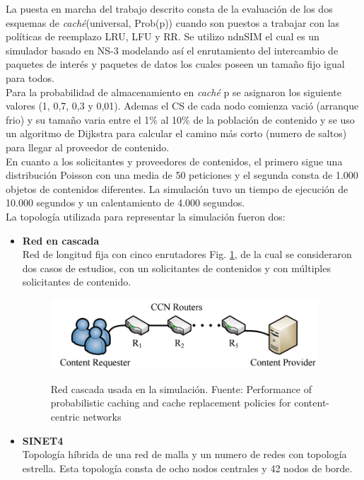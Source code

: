 \documentclass[12pt]{ociamthesis}  %
\begin{document}
La puesta en marcha del trabajo descrito consta de la evaluación de los dos esquemas de \textit{caché}(universal, Prob(p)) cuando son puestos a trabajar con las políticas de reemplazo LRU, LFU y RR. Se utilizo ndnSIM el cual es un simulador basado en NS-3 modelando así el enrutamiento del intercambio de paquetes de interés y paquetes de datos los cuales poseen un tamaño fijo igual para todos.\\
Para la probabilidad de almacenamiento en \textit{caché} p se asignaron los siguiente valores (1, 0,7, 0,3 y 0,01). Ademas el CS de cada nodo comienza vació (arranque frio) y su tamaño varia entre el 1\% al 10\% de la población de contenido y se uso un algoritmo de Dijkstra para calcular el camino más corto (numero de saltos) para llegar al proveedor de contenido.\\

En cuanto a los solicitantes y proveedores de contenidos, el primero sigue una distribución Poisson con una media de 50 peticiones y el segunda consta de 1.000 objetos de contenidos diferentes. La simulación tuvo un tiempo de ejecución de 10.000 segundos y un calentamiento de 4.000 segundos.\\

La topología utilizada para representar la simulación fueron dos:

\begin{itemize}
	\item \textbf{Red en cascada}\\
	Red de longitud fija con cinco enrutadores Fig. \ref{Topologia_cascada}, de la cual se consideraron dos casos de estudios, con un solicitantes de contenidos y con múltiples solicitantes de contenido.
	\begin{figure}[!htb]
		\centering
		\includegraphics[width=10cm]{Imagenes/Topologia_cascada}\\
		\caption{Red cascada usada en la simulación. Fuente: Performance of probabilistic caching and cache replacement policies for content-centric networks \cite{tarnoi2014performance}}
		\label{Topologia_cascada}
	\end{figure}
	
	\item \textbf{SINET4}\\
	Topología híbrida de una red de malla y un numero de redes con topología estrella. Esta topología consta de ocho nodos centrales y 42 nodos de borde.
\end{itemize}
\end{document}
